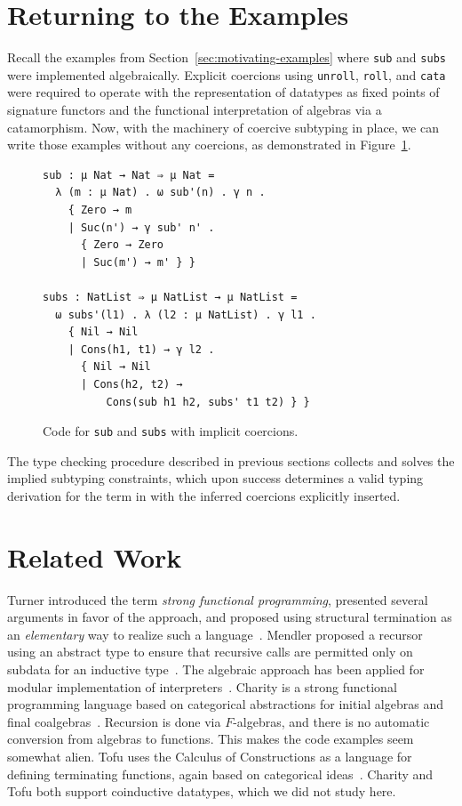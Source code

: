 \documentclass[runningheads]{llncs}
\begin{document}
\section{Returning to the Examples} %

Recall the examples from Section~\ref{sec:motivating-examples} where \texttt{sub} and \texttt{subs} were implemented algebraically.
Explicit coercions using \texttt{unroll}, \texttt{roll}, and \texttt{cata} were required to operate with the representation of datatypes as fixed points of signature functors and the functional interpretation of algebras via a catamorphism.
Now, with the machinery of coercive subtyping in place, we can write those examples without any coercions, as demonstrated in Figure~\ref{fig:example-subs-algebraic-without-coercions}.

\begin{figure}[h]
  \centering

  \begin{verbatim}
sub : μ Nat → Nat ⇒ μ Nat =
  λ (m : μ Nat) . ω sub'(n) . γ n .
    { Zero → m
    | Suc(n') → γ sub' n' .
      { Zero → Zero
      | Suc(m') → m' } }

subs : NatList ⇒ μ NatList → μ NatList =
  ω subs'(l1) . λ (l2 : μ NatList) . γ l1 .
    { Nil → Nil
    | Cons(h1, t1) → γ l2 .
      { Nil → Nil
      | Cons(h2, t2) →
          Cons(sub h1 h2, subs' t1 t2) } }
  \end{verbatim}
  \caption{Code for \texttt{sub} and \texttt{subs} with implicit coercions.}
  \label{fig:example-subs-algebraic-without-coercions}
\end{figure}

The type checking procedure described in previous sections collects and solves the implied subtyping constraints, which upon success determines a valid typing derivation for the term in \lcata with the inferred coercions explicitly inserted.

\section{Related Work} %

Turner introduced the term \emph{strong functional programming},
presented several arguments in favor of the approach, and proposed
using structural termination as an \emph{elementary} way to realize
such a language~\cite{turner95}.  Mendler proposed a recursor using an
abstract type to ensure that recursive calls are permitted only on
subdata for an inductive type~\cite{mendler91}.  The algebraic
approach has been applied for modular implementation of
interpreters~\cite{swierstra08}.  Charity is a strong functional
programming language based on categorical abstractions for initial
algebras and final coalgebras~\cite{charity92}.  Recursion is done
via $F$-algebras, and there is no automatic conversion from algebras
to functions.  This makes the code examples seem somewhat alien. Tofu
uses the Calculus of Constructions as a language for defining
terminating functions, again based on categorical
ideas~\cite{tofu10}.  Charity and Tofu both support coinductive
datatypes, which we did not study here.
\end{document}
